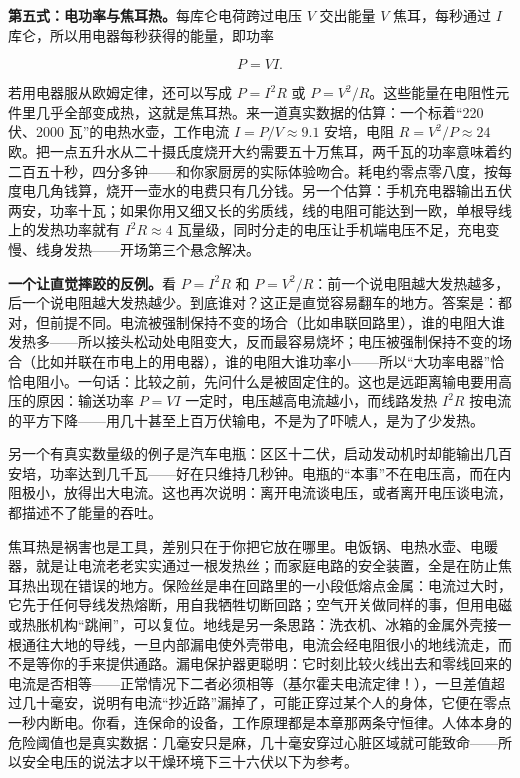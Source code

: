\textbf{第五式：电功率与焦耳热。}每库仑电荷跨过电压 \(V\) 交出能量 \(V\) 焦耳，每秒通过 \(I\) 库仑，所以用电器每秒获得的能量，即功率

\[
P=VI.
\]

若用电器服从欧姆定律，还可以写成 \(P=I^{2}R\) 或 \(P=V^{2}/R\)。这些能量在电阻性元件里几乎全部变成热，这就是焦耳热。来一道真实数据的估算：一个标着“220 伏、2000 瓦”的电热水壶，工作电流 \(I=P/V\approx9.1\) 安培，电阻 \(R=V^{2}/P\approx24\) 欧。把一点五升水从二十摄氏度烧开大约需要五十万焦耳，两千瓦的功率意味着约二百五十秒，四分多钟——和你家厨房的实际体验吻合。耗电约零点零八度，按每度电几角钱算，烧开一壶水的电费只有几分钱。另一个估算：手机充电器输出五伏两安，功率十瓦；如果你用又细又长的劣质线，线的电阻可能达到一欧，单根导线上的发热功率就有 \(I^{2}R\approx4\) 瓦量级，同时分走的电压让手机端电压不足，充电变慢、线身发热——开场第三个悬念解决。

\textbf{一个让直觉摔跤的反例。}看 \(P=I^{2}R\) 和 \(P=V^{2}/R\)：前一个说电阻越大发热越多，后一个说电阻越大发热越少。到底谁对？这正是直觉容易翻车的地方。答案是：都对，但前提不同。电流被强制保持不变的场合（比如串联回路里），谁的电阻大谁发热多——所以接头松动处电阻变大，反而最容易烧坏；电压被强制保持不变的场合（比如并联在市电上的用电器），谁的电阻大谁功率小——所以“大功率电器”恰恰电阻小。一句话：比较之前，先问什么是被固定住的。这也是远距离输电要用高压的原因：输送功率 \(P=VI\) 一定时，电压越高电流越小，而线路发热 \(I^{2}R\) 按电流的平方下降——用几十甚至上百万伏输电，不是为了吓唬人，是为了少发热。

另一个有真实数量级的例子是汽车电瓶：区区十二伏，启动发动机时却能输出几百安培，功率达到几千瓦——好在只维持几秒钟。电瓶的“本事”不在电压高，而在内阻极小，放得出大电流。这也再次说明：离开电流谈电压，或者离开电压谈电流，都描述不了能量的吞吐。

焦耳热是祸害也是工具，差别只在于你把它放在哪里。电饭锅、电热水壶、电暖器，就是让电流老老实实通过一根发热丝；而家庭电路的安全装置，全是在防止焦耳热出现在错误的地方。保险丝是串在回路里的一小段低熔点金属：电流过大时，它先于任何导线发热熔断，用自我牺牲切断回路；空气开关做同样的事，但用电磁或热胀机构“跳闸”，可以复位。地线是另一条思路：洗衣机、冰箱的金属外壳接一根通往大地的导线，一旦内部漏电使外壳带电，电流会经电阻很小的地线流走，而不是等你的手来提供通路。漏电保护器更聪明：它时刻比较火线出去和零线回来的电流是否相等——正常情况下二者必须相等（基尔霍夫电流定律！），一旦差值超过几十毫安，说明有电流“抄近路”漏掉了，可能正穿过某个人的身体，它便在零点一秒内断电。你看，连保命的设备，工作原理都是本章那两条守恒律。人体本身的危险阈值也是真实数据：几毫安只是麻，几十毫安穿过心脏区域就可能致命——所以安全电压的说法才以干燥环境下三十六伏以下为参考。

